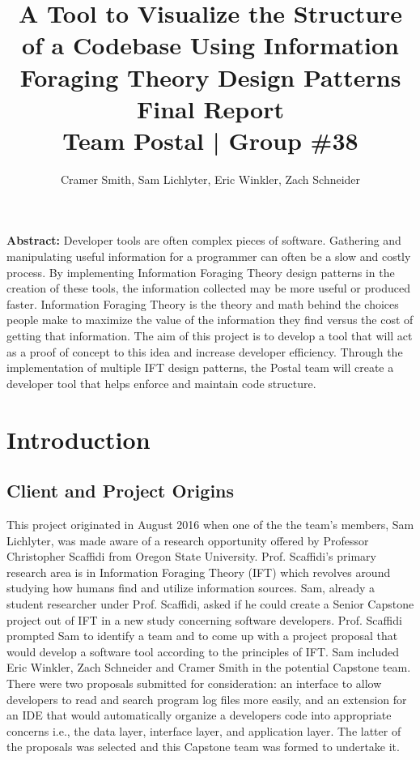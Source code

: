 \documentclass[letterpaper,10pt,titlepage,draftclsnofoot,onecolumn,onesided] {IEEEtran}
\def\doctitle{A Tool to Visualize the Structure of a Codebase Using Information Foraging Theory Design Patterns}
\def\doctype{Final Report}
\def\team{Team Postal | Group \#38}
\begin{document}
\title{\Huge{\bfseries{\textsf{\doctitle}}}\\\textsf{\Large{\doctype}}\\\textsf{\large{\team}}}
\author{Cramer Smith, Sam Lichlyter, Eric Winkler, Zach Schneider}

\maketitle
\vfill

\setlength\parindent{0pt} \textbf{Abstract:} Developer tools are often complex pieces of software. 
Gathering and manipulating useful information for a programmer can often be a slow and costly process. 
By implementing Information Foraging Theory design patterns in the creation of these tools, the information collected may be more useful or produced faster. 
Information Foraging Theory is the theory and math behind the choices people make to maximize the value of the information they find versus the cost of getting that information.
The aim of this project is to develop a tool that will act as a proof of concept to this idea and increase developer efficiency.
Through the implementation of multiple IFT design patterns, the Postal team will create a developer tool that helps enforce and maintain code structure. 

\vfill

\pagebreak

\tableofcontents


\pagebreak

\section{Introduction}
\subsection{Client and Project Origins}
This project originated in August 2016 when one of the the team's members, Sam Lichlyter, was made aware of a research opportunity offered by Professor Christopher Scaffidi from Oregon State University. 
Prof. Scaffidi's primary research area is in Information Foraging Theory (IFT) which revolves around studying how humans find and utilize information sources. 
Sam, already a student researcher under Prof. Scaffidi, asked if he could create a Senior Capstone project out of IFT in a new study concerning software developers.
Prof. Scaffidi prompted Sam to identify a team and to come up with a project proposal that would develop a software tool according to the principles of IFT. 
Sam included Eric Winkler, Zach Schneider and Cramer Smith in the potential Capstone team. 
There were two proposals submitted for consideration: an interface to allow developers to read and search program log files more easily, and an extension for an IDE that would automatically organize a developers code into appropriate concerns i.e., the data layer, interface layer, and application layer.
The latter of the proposals was selected and this Capstone team was formed to undertake it.
\end{document}
